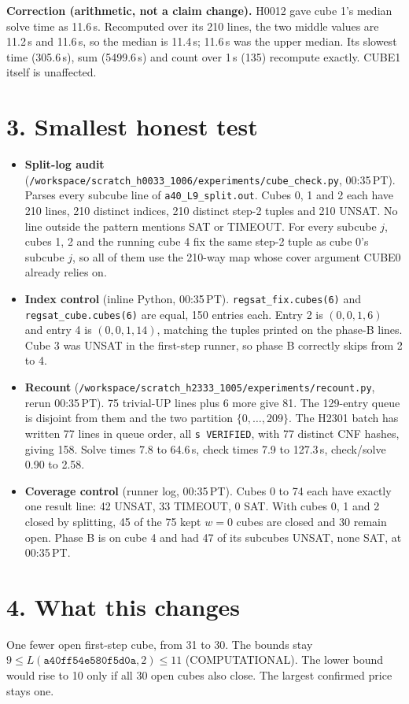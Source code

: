 \documentclass[11pt]{article}
\begin{document}
\textbf{Correction (arithmetic, not a claim change).} H0012 gave cube 1's median solve time as 11.6\,s. Recomputed over its 210 lines, the two middle values are 11.2\,s and 11.6\,s, so the median is 11.4\,s; 11.6\,s was the upper median. Its slowest time (305.6\,s), sum (5499.6\,s) and count over 1\,s (135) recompute exactly. CUBE1 itself is unaffected.

\section*{3. Smallest honest test}
\begin{itemize}
\item \textbf{Split-log audit} (\texttt{/workspace/scratch\_h0033\_1006/experiments/cube\_check.py}, 00:35\,PT). Parses every subcube line of \texttt{a40\_L9\_split.out}. Cubes 0, 1 and 2 each have 210 lines, 210 distinct indices, 210 distinct step-2 tuples and 210 UNSAT. No line outside the pattern mentions SAT or TIMEOUT. For every subcube $j$, cubes 1, 2 and the running cube 4 fix the same step-2 tuple as cube 0's subcube $j$, so all of them use the 210-way map whose cover argument CUBE0 already relies on.
\item \textbf{Index control} (inline Python, 00:35\,PT). \texttt{regsat\_fix.cubes(6)} and \texttt{regsat\_cube.cubes(6)} are equal, 150 entries each. Entry 2 is $(0,0,1,6)$ and entry 4 is $(0,0,1,14)$, matching the tuples printed on the phase-B lines. Cube 3 was UNSAT in the first-step runner, so phase B correctly skips from 2 to 4.
\item \textbf{Recount} (\texttt{/workspace/scratch\_h2333\_1005/experiments/recount.py}, rerun 00:35\,PT). 75 trivial-UP lines plus 6 more give 81. The 129-entry queue is disjoint from them and the two partition $\{0,\dots,209\}$. The H2301 batch has written 77 lines in queue order, all \texttt{s VERIFIED}, with 77 distinct CNF hashes, giving 158. Solve times 7.8 to 64.6\,s, check times 7.9 to 127.3\,s, check/solve 0.90 to 2.58.
\item \textbf{Coverage control} (runner log, 00:35\,PT). Cubes 0 to 74 each have exactly one result line: 42 UNSAT, 33 TIMEOUT, 0 SAT. With cubes 0, 1 and 2 closed by splitting, 45 of the 75 kept $w=0$ cubes are closed and 30 remain open. Phase B is on cube 4 and had 47 of its subcubes UNSAT, none SAT, at 00:35\,PT.
\end{itemize}

\section*{4. What this changes}
One fewer open first-step cube, from 31 to 30. The bounds stay $9\le L(\texttt{a40ff54e580f5d0a},2)\le 11$ (COMPUTATIONAL). The lower bound would rise to 10 only if all 30 open cubes also close. The largest confirmed price stays one.
\end{document}
